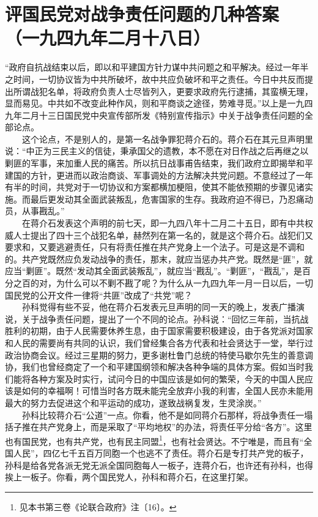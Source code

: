 \documentclass[cn,11pt,chinese]{elegantbook}
\def\myformat#1{\hfil\hfil #1}
\begin{document}
\newpage\section*{\myformat{评国民党对战争责任问题的几种答案}\\\myformat{（一九四九年二月十八日）}}
“政府自抗战结束以后，即以和平建国方针力谋中共问题之和平解决。经过一年半之时间，一切协议皆为中共所破坏，故中共应负破坏和平之责任。今日中共反而提出所谓战犯名单，将政府负责人士尽皆列入，更要求政府先行逮捕，其蛮横无理，显而易见。中共如不改变此种作风，则和平商谈之途径，势难寻觅。”以上是一九四九年二月十三日国民党中央宣传部所发《特别宣传指示》中关于战争责任问题的全部论点。\\
　　这个论点，不是别人的，是第一名战争罪犯蒋介石的。蒋介石在其元旦声明里说：“中正为三民主义的信徒，秉承国父的遗教，本不愿在对日作战之后再继之以剿匪的军事，来加重人民的痛苦。所以抗日战事甫告结束，我们政府立即揭举和平建国的方针，更进而以政治商谈、军事调处的方法解决共党问题。不意经过了一年有半的时间，共党对于一切协议和方案都横加梗阻，使其不能依预期的步骤见诸实施。而最后更发动其全面武装叛乱，危害国家的生存。我政府迫不得已，乃忍痛动员，从事戡乱。”\\
　　在蒋介石发表这个声明的前七天，即一九四八年十二月二十五日，即有中共权威人士提出了四十三个战犯名单，赫然列在第一名的，就是这个蒋介石。战犯们又要求和，又要逃避责任，只有将责任推在共产党身上一个法子。可是这是不调和的。共产党既然应负发动战争的责任，那末，就应当惩办共产党。既然是“匪”，就应当“剿匪”。既然“发动其全面武装叛乱”，就应当“戡乱”。“剿匪”，“戡乱”，是百分之百的对，为什么可以不剿不戡了呢？为什么从一九四九年一月一日以后，一切国民党的公开文件一律将“共匪”改成了“共党”呢？\\
　　孙科觉得有些不妥，他在蒋介石发表元旦声明的同一天的晚上，发表广播演说，关于战争责任问题，提出了一个不同的论点。孙科说：“回忆三年前，当抗战胜利的初期，由于人民需要休养生息，由于国家需要积极建设，由于各党派对国家和人民的需要尚有共同的认识，我们曾经集合各方代表和社会贤达于一堂，举行过政治协商会议。经过三星期的努力，更多谢杜鲁门总统的特使马歇尔先生的善意调协，我们也曾经商定了一个和平建国纲领和解决各种争端的具体方案。假如当时我们能将各种方案及时实行，试问今日的中国应该是如何的繁荣，今天的中国人民应该是如何的幸福啊！可惜当时各方既未能完全放弃小我的利害，全国人民亦未能用最大的努力去促进这个和平运动的成功，遂致战祸复发，生灵涂炭。”\\
　　孙科比较蒋介石“公道”一点。你看，他不是如同蒋介石那样，将战争责任一塌括子推在共产党身上，而是采取了“平均地权”的办法，将责任平分给“各方”。这里也有国民党，也有共产党，也有民主同盟\footnote[1]{ 见本书第三卷《论联合政府》注〔16〕。}，也有社会贤达。不宁唯是，而且有“全国人民”，四亿七千五百万同胞一个也逃不了责任。蒋介石是专打共产党的板子，孙科是给各党各派无党无派全国同胞每人一板子，连蒋介石，也许还有孙科，也得挨上一板子。你看，两个国民党人，孙科和蒋介石，在这里打架。\\
\end{document}
